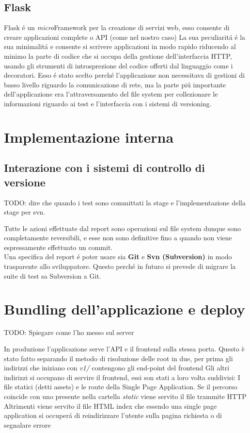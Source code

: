         \subsection{Flask}  
            Flask \'e un \textit{micro}Framework per la creazione di servizi web, esso consente di creare applicazioni complete o API (come nel nostro caso)
            La sua peculiarit\'a \'e la sua minimalit\'a e consente si scrivere applicazioni in modo rapido riducendo al minimo la parte di codice che si occupa della gestione dell'interfaccia HTTP, usando gli strumenti di introsprezione del codice offerti dal linguaggio come i decoratori.
            Esso \'e stato scelto perch\'e l'applicazione non necessitava di gestioni di basso livello riguardo la comunicazione di rete, ma la parte pi\'u importante dell'applicazione era l'attraversamento del file system per collezionare le informazioni riguardo ai test e l'interfaccia con i sistemi di versioning.

    \section{Implementazione interna}
        \subsection{Interazione con i sistemi di controllo di versione}
                
            TODO: dire che quando i test sono committati la stage e l'implementazione della stage per svn.

            Tutte le azioni effettuate dal report sono operazioni sul file system dunque sono completamente reversibili, e esse non sono definitive fino a quando non viene espressamente effettuato un commit.\\
            Una specifica del report \'e poter usare sia \textbf{Git} e \textbf{Svn (Subversion)} in modo trasparente allo sviluppatore.
            Questo perch\'e in futuro si prevede di migrare la suite di test sa Subversion a Git.
    
    \section{Bundling dell'applicazione e deploy}
        TODO: Spiegare come l'ho messo sul server

        In produzione l'applicazione serve l'API e il frontend sulla stessa porta.
        Questo è stato fatto separando il metodo di risoluzione delle root in due, per prima gli indirizzi che iniziano con \textit{v1/} contengono gli end-point del frontend
        Gli altri indirizzi si occupano di servire il frontend, essi son stati a loro volta suddivisi:
        I file statici (detti assets) e le route della Single Page Application.
        Se il percorso coincide con uno presente nella cartella \textit{static} viene servito il file trammite HTTP
        Altrimenti viene servito il file HTML index che essendo una single page application si occuper\'a di reindirizzare l'utente sulla pagina richiesta o di segnalare errore
